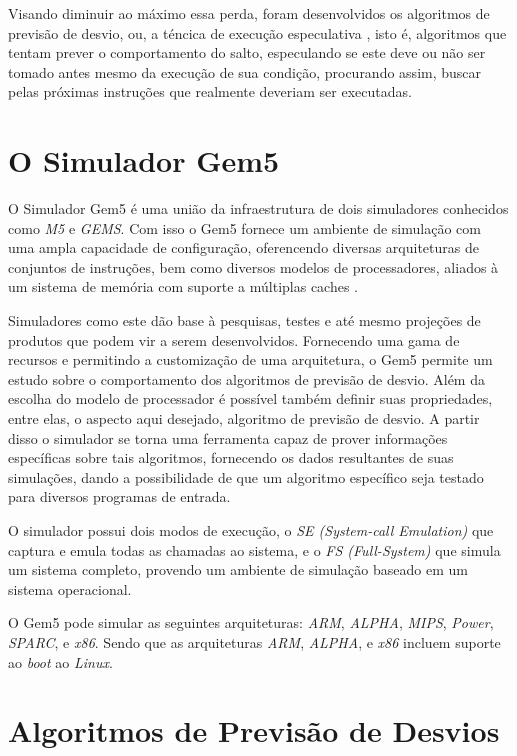 \documentclass[12pt]{article}
\begin{document}
Visando diminuir ao máximo essa perda, foram desenvolvidos
os algoritmos de previsão de desvio, ou, a téncica de execução especulativa \cite{pedronette:06},
isto é, algoritmos que tentam prever o comportamento do salto, especulando se este deve ou não ser tomado
antes mesmo da execução de sua condição, procurando assim, buscar pelas próximas instruções que realmente
deveriam ser executadas. 

\section{O Simulador Gem5} \label{simg5}

O Simulador Gem5 é uma união da infraestrutura de dois simuladores conhecidos como \textit{M5} e \textit{GEMS}. 
Com isso o Gem5 fornece um ambiente de simulação com uma ampla capacidade de configuração, oferencendo diversas
arquiteturas de conjuntos de instruções, bem como diversos modelos de processadores, aliados à um sistema de memória
com suporte a múltiplas caches \cite{gem5sim}.

Simuladores como este dão base à pesquisas, testes e até mesmo projeções de produtos que podem vir a serem desenvolvidos.
Fornecendo uma gama de recursos e permitindo a customização de uma arquitetura, o Gem5 permite um estudo sobre o
comportamento dos algoritmos de previsão de desvio. Além da escolha do modelo de processador é possível também definir 
suas propriedades, entre elas, o aspecto aqui desejado, algoritmo de previsão de desvio. A partir disso o simulador
se torna uma ferramenta capaz de prover informações específicas sobre tais algoritmos, fornecendo os dados resultantes 
de suas simulações, dando a possibilidade de que um algoritmo específico seja testado para diversos programas de entrada.

O simulador possui dois modos de execução, o \textit{SE (System-call Emulation)} que captura e emula todas as chamadas
ao sistema, e o \textit{FS (Full-System)} que simula um sistema completo, provendo um ambiente de simulação baseado em um
sistema operacional.

O Gem5 pode simular as seguintes arquiteturas: \textit{ARM}, \textit{ALPHA}, \textit{MIPS}, \textit{Power}, \textit{SPARC}, e \textit{x86}.
Sendo que as arquiteturas \textit{ARM}, \textit{ALPHA}, e \textit{x86} incluem suporte ao \textit{boot} ao \textit{Linux}.

\section{Algoritmos de Previsão de Desvios}
\end{document}
